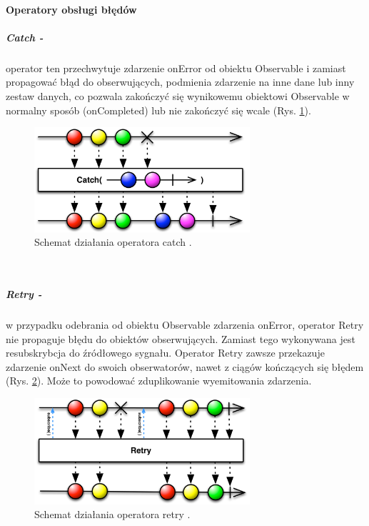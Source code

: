 \documentclass[12pt,oneside,a4paper]{report}
\begin{document}
\paragraph{Operatory obsługi błędów}
\subparagraph{Catch -}operator ten przechwytuje zdarzenie onError od obiektu Observable i zamiast propagować błąd do obserwujących, podmienia zdarzenie na inne dane lub inny zestaw danych, co pozwala zakończyć się wynikowemu obiektowi Observable w normalny sposób (onCompleted) lub nie zakończyć się wcale (Rys. \ref{catch}).
\begin{figure}[ht!]
	\centering
	\includegraphics[width=8cm]{catch}
	\caption{Schemat działania operatora catch \cite{operators}.}
	\label{catch}
\end{figure}\\

\subparagraph{Retry -}w przypadku odebrania od obiektu Observable zdarzenia onError, operator Retry nie propaguje błędu do obiektów obserwujących. Zamiast tego wykonywana jest resubskrybcja do źródłowego sygnału. Operator Retry zawsze przekazuje zdarzenie onNext do swoich obserwatorów, nawet z ciągów kończących się błędem (Rys. \ref{retry}). Może to powodować zduplikowanie wyemitowania zdarzenia.
\begin{figure}[ht!]
	\centering
	\includegraphics[width=8cm]{retry}
	\caption{Schemat działania operatora retry \cite{operators}.}
	\label{retry}
\end{figure}\\
\end{document}
